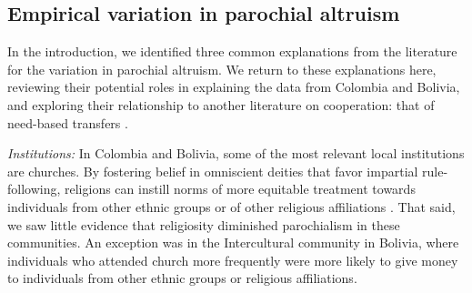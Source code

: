 \documentclass[bibauthoryear]{aa}
\begin{document}

\subsection{Empirical variation in parochial altruism}

In the introduction, we identified three common explanations from the literature for the variation in parochial altruism. We return to these explanations here, reviewing their potential roles in explaining the data from Colombia and Bolivia, and exploring their relationship to another literature on cooperation: that of need-based transfers \citep[e.g.,][]{peterson1993demand, hooper2015inclusive, aktipis2016cooperation, hao2015need, cronk2019managing}.

\emph{Institutions:} In Colombia and Bolivia, some of the most relevant local institutions are churches. By fostering belief in omniscient deities that favor impartial rule-following, religions can instill norms of more equitable treatment towards individuals from other ethnic groups or of other religious affiliations \citep{purzycki2018evolution, lang2019moralizing}. That said, we saw little evidence that religiosity diminished parochialism in these communities. An exception was in the Intercultural community in Bolivia, where individuals who attended church more frequently were more likely to give money to individuals from other ethnic groups or religious affiliations. 
\end{document}
